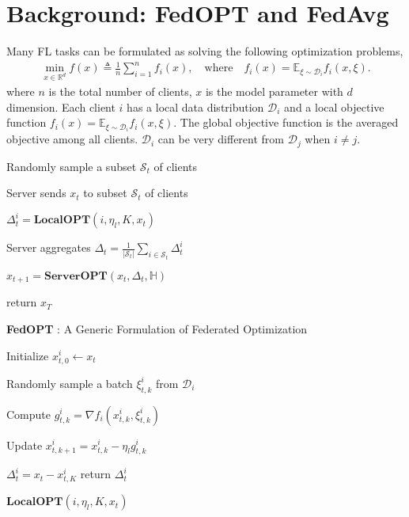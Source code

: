 \section{Background: FedOPT and FedAvg}
\label{sec:background}

Many FL tasks can be formulated as solving the following optimization problems, 
\begin{equation}
\begin{gathered}
\min_{x\in\mathbb{R}^d}f(x)\triangleq\frac{1}{n}\sum_{i=1}^n f_i(x), \quad
\text{where} \quad f_i(x)=\mathbb{E}_{\xi\sim \mathcal{D}_i} f_i(x,\xi).
\end{gathered}
\label{fed_min_objective}
\end{equation}
where $n$ is the total number of clients, $x$ is the model parameter with $d$ dimension. Each client $i$ has a local data distribution $\mathcal{D}_i$ and a local objective function $f_i(x)=\mathbb{E}_{\xi\sim \mathcal{D}_i} f_i(x,\xi)$. The global objective function is the averaged objective among all clients. $\mathcal{D}_i$ can be very different from $\mathcal{D}_j$ when $i\neq j$.


\begin{algorithm2e}[tb]
\SetAlgoVlined
{}
\SetAlgoLined
{}
{   
    Randomly sample a subset $\mathcal{S}_t$ of clients
    
    Server sends $x_t$ to subset $\mathcal{S}_t$ of clients
    
    {
    $\Delta_t^i=\textbf{LocalOPT}\left(i,\eta_l,K,x_t\right)$
    }
    
    Server aggregates $\Delta_t=\frac{1}{\lvert \mathcal{S}_t\rvert}\sum_{i\in \mathcal{S}_t}\Delta_t^i$
    
    $x_{t+1} = \textbf{ServerOPT}\left(x_t,\Delta_t,\mathbb{H}\right)$

}
return $x_T$
\caption{\textbf{FedOPT} \citep{reddi2020adaptive}: A Generic Formulation of Federated Optimization}
\label{alg:fedopt}
\end{algorithm2e}

\begin{algorithm2e}[tp]
\SetAlgoVlined
{}
\SetAlgoLined
Initialize $x_{t,0}^i\gets x_t$
    
{
Randomly sample a batch $\xi_{t,k}^i$ from $\mathcal{D}_i$
    
Compute $g_{t,k}^i=\nabla f_i(x_{t,k}^i, \xi_{t,k}^i)$
    
Update $x_{t,k+1}^i=x_{t,k}^i-\eta_l g_{t,k}^i$
}
$\Delta_t^i=x_t-x_{t,K}^i$
return $\Delta_t^i$
\caption{$\textbf{LocalOPT}\left(i,\eta_l,K,x_t\right)$}
\label{alg:localopt}
\end{algorithm2e}



